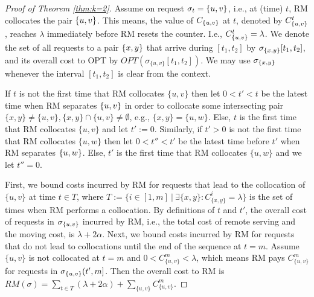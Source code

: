 \documentclass[a4paper,anonymous,USenglish]{lipics-v2019}
\newcommand{\OPT}{\textsf{OPT}\xspace}
\newcommand{\RM}{\textsf{RM}\xspace} %
\DeclarePairedDelimiter\set{\{}{\}}
\begin{document}
\begin{proof}[Proof of Theorem \ref{thm:k=2}]
	Assume on request $\sigma_{t}=\set{u,v}$, 
	i.e., at (time) $t$,
	\RM collocates the pair $\set{u,v}$.
	This means,
	the value of $C_{\set{u,v}}$ at $t$,
	denoted by $C^t_{\set{u,v}}$, 
	reaches $\lambda$ immediately before \RM resets the counter.
	I.e.,
	$ C^t_{\set{u,v}} = \lambda$.
	We denote the set of all requests to a pair $\set{x,y}$ that arrive
	during $[t_1,t_2]$ by $\sigma_{\set{x,y}}[t_1,t_2]$,
	and its overall cost to \OPT by
	$\mathit{OPT} (\sigma_{\{u,v\}}[t_1,t_2])$.
	We may use $\sigma_{\set{x,y}}$ whenever
	 the interval $[t_1,t_2]$ is clear from the context.
	
	If $t$ is not the first time that \RM collocates $\{u,v\}$ then
	let $0 < t' < t$ be the latest time when \RM separates $\set{u,v}$
	in order to collocate some intersecting pair
	$\{x,y\} \neq \{u,v\}, \{x,y\} \cap \{u,v\} \neq \emptyset$, 
	e.g.,
	$\{x,y\}=\{u,w\}$.
	Else,
	$t$ is the first time that \RM collocates $\{u,v\}$ and let $t' := 0$.
	Similarly,
	if $t' > 0$ is not the first time that \RM  collocates $\{u,w\}$ 
	then let $0 < t'' < t'$ be the latest time before $t'$ when \RM separates $\set{u,w}$.
	Else,
	$t'$ is the first time that \RM collocates $\{u,w\}$ and we let $t''=0$.
	
	First,
	we bound  costs incurred by \RM for requests that
	lead to the collocation of $\{u,v\}$ at time $t \in T$, where
	$T := \{ i \in [1,m] ~\vert~ \exists \{x,y\}: C^{i}_{\{x,y\}} = \lambda \}$
	is the set of times when \RM performs a collocation.
	By definitions of $t$ and $t'$,
	the overall cost of requests in $\sigma_{\set{u,v}}$ incurred by \RM,
	i.e., the total cost of remote serving
	and the moving cost, is
	$\lambda + 2\alpha$.	
	Next,
	we bound costs incurred by \RM
	for requests that do not lead to collocations until the  end of the sequence at $t=m$.
	Assume $\{u,v\}$ is not collocated at $t=m$
	and $0 < C^{m}_{ \{u,v\} } < \lambda $,
	which means \RM pays $C^{m}_{ \{u,v\} }$
	for  requests in $\sigma_{\set{u,v}}(t',m]$.
    Then the overall cost to \RM is
$	\mathit{RM} (\sigma)
=
\sum_{ t \in T}(\lambda + 2\alpha) +
\sum_{\{u,v\}} C^{m}_{\{u,v\}}	
$.
	

\end{proof}
\end{document}
